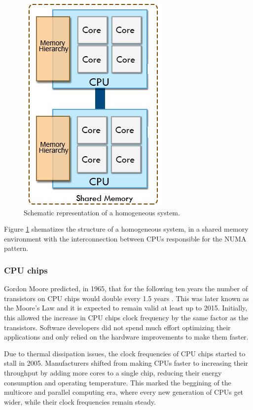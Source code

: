 \begin{figure}[!htp]
	\begin{center}
		\includegraphics[scale=0.4]{../../common/img/homoplats.png}
		\caption{Schematic representation of a homogeneous system.}
		\label{fig:HomogeneousSystem}
	\end{center}
\end{figure}

Figure \ref{fig:HomogeneousSystem} shematizes the structure of a homogeneous system, in a shared memory environment with the interconnection between CPUs responsible for the NUMA pattern.

\subsubsection*{CPU chips}
\label{CPUChips}

Gordon Moore predicted, in 1965, that for the following ten years the number of transistors on CPU chips would double every 1.5 years \cite{MooreLaw}. This was later known as the Moore's Law and it is expected to remain valid at least up to 2015. Initially, this allowed the increase in CPU chips clock frequency by the same factor as the transistors. Software developers did not spend much effort optimizing their applications and only relied on the hardware improvements to make them faster.

Due to thermal dissipation issues, the clock frequencies of CPU chips started to stall in 2005. Manufacturers shifted from making CPUs faster to increasing their throughput by adding more cores to a single chip, reducing their energy consumption and operating temperature. This marked the beggining of the multicore and parallel computing era, where every new generation of CPUs get wider, while their clock frequencies remain steady.

